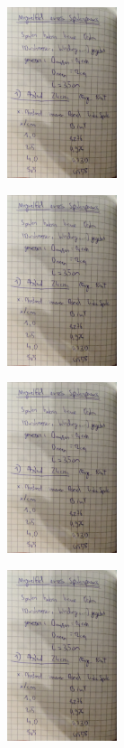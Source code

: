 \begin{minipage}[t]{0.4\textwidth}
    \includegraphics[height=5cm, page=1]{scans_messdaten/v308_spulenpaar.pdf}
\end{minipage}
\begin{minipage}[t]{0.4\textwidth}
    \includegraphics[height=5cm, keepaspectratio, page=2]{scans_messdaten/v308_spulenpaar.pdf}
\end{minipage}

\begin{minipage}[t]{0.4\textwidth}
    \includegraphics[height=5cm, page=3]{scans_messdaten/v308_spulenpaar.pdf}
\end{minipage}
\begin{minipage}[t]{0.4\textwidth}
    \includegraphics[height=5cm, page=4]{scans_messdaten/v308_spulenpaar.pdf}
\end{minipage}

